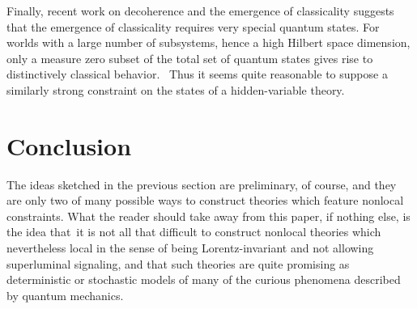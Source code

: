 \documentclass[12pt]{article}%
\begin{document}
Finally, recent work on decoherence and the emergence of classicality
\cite{SW08} suggests that the emergence of classicality requires very special
quantum states. For worlds with a large number of subsystems, hence a high
Hilbert space dimension, only a measure zero subset of the total set of
quantum states gives rise to distinctively classical behavior. \ Thus it seems
quite reasonable to suppose a similarly strong constraint on the states of a
hidden-variable theory.

\section{Conclusion}

The ideas sketched in the previous section are preliminary, of course, and
they are only two of many possible ways to construct theories which feature
nonlocal constraints. What the reader should take away from this paper, if
nothing else, is the idea that\ it is not all that difficult to construct
nonlocal theories which nevertheless local in the sense of being
Lorentz-invariant and not allowing superluminal signaling, and that such
theories are quite promising as deterministic or stochastic models of many of
the curious phenomena described by quantum mechanics.
\end{document}

